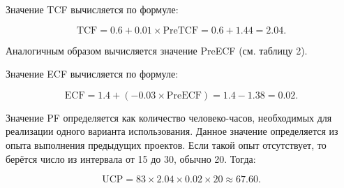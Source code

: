 \documentclass[14pt,russian]{extarticle}
\begin{document}
Значение TCF вычисляется по формуле:

\begin{equation}
	\mathrm{TCF} = 0.6 + 0.01 \times \mathrm{PreTCF} = 0.6 + 1.44 = 2.04.
\end{equation}

Аналогичным образом вычисляется значение PreECF (см. таблицу 2).

\begin{table}[H]
	\caption{Получение значения PreECF}

\end{table}

Значение ECF вычисляется по формуле:

\begin{equation}
	\mathrm{ECF} = 1.4 + (-0.03 \times \mathrm{PreECF}) = 1.4 - 1.38 = 0.02.
\end{equation}

Значение PF определяется как количество человеко-часов, необходимых для
реализации одного варианта использования. Данное значение определяется из опыта
выполнения предыдущих проектов. Если такой опыт отсутствует, то берётся число из
интервала от 15 до 30, обычно 20. Тогда:

\begin{equation}
	\mathrm{UCP} = 83 \times 2.04 \times 0.02 \times 20 \approx 67.60.
\end{equation}
\end{document}

